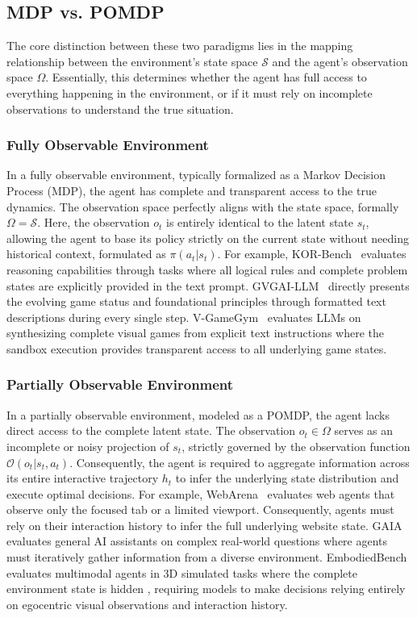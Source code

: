 \subsection{MDP vs. POMDP}
\label{attribute:MDP vs. POMDP}

The core distinction between these two paradigms lies in the mapping relationship between the environment's state space $\mathcal{S}$ and the agent's observation space $\Omega$. Essentially, this determines whether the agent has full access to everything happening in the environment, or if it must rely on incomplete observations to understand the true situation.

\subsubsection{Fully Observable Environment}
In a fully observable environment, typically formalized as a Markov Decision Process (MDP), the agent has complete and transparent access to the true dynamics. The observation space perfectly aligns with the state space, formally $\Omega = \mathcal{S}$. Here, the observation $o_t$ is entirely identical to the latent state $s_t$, allowing the agent to base its policy strictly on the current state without needing historical context, formulated as $\pi(a_t | s_t)$. For example, KOR-Bench~\cite{KOR-Bench} evaluates reasoning capabilities through tasks where all logical rules and complete problem states are explicitly provided in the text prompt. GVGAI-LLM~\cite{GVGAI-LLM} directly presents the evolving game status and foundational principles through formatted text descriptions during every single step. V-GameGym~\cite{V-GameGym} evaluates LLMs on synthesizing complete visual games from explicit text instructions where the sandbox execution provides transparent access to all underlying game states.

\subsubsection{Partially Observable Environment}
In a partially observable environment, modeled as a POMDP, the agent lacks direct access to the complete latent state. The observation $o_t \in \Omega$ serves as an incomplete or noisy projection of $s_t$, strictly governed by the observation function $\mathcal{O}(o_t | s_t, a_t)$. Consequently, the agent is required to aggregate information across its entire interactive trajectory $h_t$ to infer the underlying state distribution and execute optimal decisions. For example, WebArena~\cite{WebArena} evaluates web agents that observe only the focused tab or a limited viewport. Consequently, agents must rely on their interaction history to infer the full underlying website state. GAIA~\cite{GAIA} evaluates general AI assistants on complex real-world questions where agents must iteratively gather information from a diverse environment. EmbodiedBench~\cite{EmbodiedBench} evaluates multimodal agents in 3D simulated tasks where the complete environment state is hidden , requiring models to make decisions relying entirely on egocentric visual observations and interaction history.


